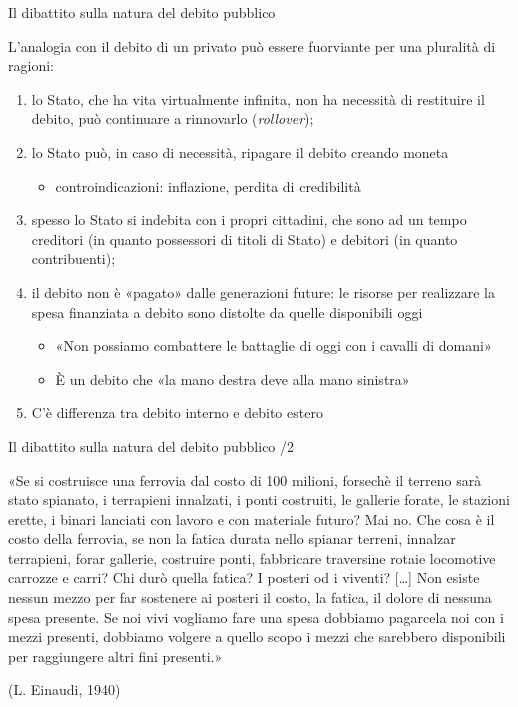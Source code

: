 \documentclass[aspectratio=149,11pt,italian]{beamer}
\begin{document}
\begin{frame}{Il dibattito sulla natura del debito pubblico}

  L'analogia con il debito di un privato può essere fuorviante per una
  pluralità di ragioni:
  \begin{enumerate}
  \item lo Stato, che ha vita virtualmente infinita, non ha necessità di
    restituire il debito, può continuare a rinnovarlo (\emph{rollover});
  \item lo Stato può, in caso di necessità, ripagare il debito creando moneta
    \begin{itemize}
    \item controindicazioni: inflazione, perdita di credibilità
    \end{itemize}
  \item spesso lo Stato si indebita con i propri cittadini, che sono ad un
    tempo creditori (in quanto possessori di titoli di Stato) e debitori (in
    quanto contribuenti);
  \item il debito non è «pagato» dalle generazioni future: le risorse per
    realizzare la spesa finanziata a debito sono distolte da quelle
    disponibili oggi
    \begin{itemize}
    \item «Non possiamo combattere le battaglie di oggi con i cavalli di
      domani»
    \item È un debito che «la mano destra deve alla mano sinistra»
    \end{itemize}
  \item C'è differenza tra debito interno e debito estero
  \end{enumerate}
\end{frame}

\begin{frame}{Il dibattito sulla natura del debito pubblico /2}

  \begin{quoting}
    \small «Se si costruisce una ferrovia dal costo di 100 milioni,
    forsechè il terreno sarà stato spianato, i terrapieni innalzati, i ponti
    costruiti, le gallerie forate, le stazioni erette, i binari lanciati con
    lavoro e con materiale futuro?  Mai no. Che cosa è il costo della
    ferrovia, se non la fatica durata nello spianar terreni, innalzar
    terrapieni, forar gallerie, costruire ponti, fabbricare traversine rotaie
    locomotive carrozze e carri? Chi durò quella fatica?  I posteri od i
    viventi? […] Non esiste nessun mezzo per far sostenere ai posteri il
    costo, la fatica, il dolore di nessuna spesa presente. Se noi vivi
    vogliamo fare una spesa dobbiamo pagarcela noi con i mezzi presenti,
    dobbiamo volgere a quello scopo i mezzi che sarebbero disponibili per
    raggiungere altri fini presenti.»

    (L. Einaudi, 1940)
  \end{quoting}
\end{frame}
\end{document}
